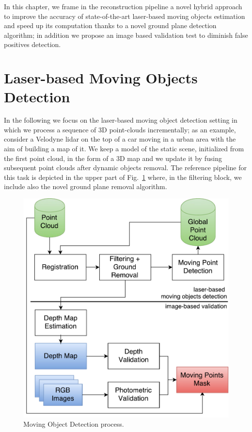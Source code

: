 In this chapter, we frame in the reconstruction pipeline a novel hybrid approach to improve the accuracy of state-of-the-art laser-based moving objects estimation and speed up its computation thanks to a novel ground plane detection algorithm; in addition we propose an image based validation test to diminish false positives detection. 



\section{Laser-based Moving Objects Detection}%
\label{sec:lidar}
In the following we focus on the laser-based moving object detection setting in which we process a sequence of 3D point-clouds incrementally; as an example, consider a Velodyne lidar on the top of a car moving in a urban area with the aim of building a map of it. 
We keep a model of the static scene, initialized from the first point cloud, in the form of a 3D map and we update it by fusing subsequent point clouds after dynamic objects removal. 
The reference pipeline for this task is depicted in the upper part of Fig.~\ref{fig:algo} where, in the filtering block, we include also the novel ground plane removal algorithm.

\begin{figure}[t]
\centering
\includegraphics[width=0.77\columnwidth]{./img/ch-laser/MovingPointDetection}
\caption{Moving Object Detection process.}
\label{fig:algo}
\end{figure}
%
